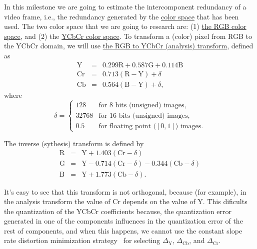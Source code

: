 In this milestone we are going to estimate the intercomponent
redundancy of a video frame, i.e., the redundancy generated by the
\href{https://en.wikipedia.org/wiki/Color_space}{color space} that has
been used. The two color space that we are going to research are: (1)
\href{https://en.wikipedia.org/wiki/RGB_color_model}{the RGB color
  space}, and (2) the \href{https://en.wikipedia.org/wiki/YCbCr}{YCbCr
  color space}. To transform a (color) pixel from RGB to the YCbCr
domain, we will use
\href{https://docs.opencv.org/3.4/de/d25/imgproc_color_conversions.html}{the
  RGB to YCbCr (analysis) transform}, defined as
\begin{equation}
  \begin{array}{lcl}
    \text{Y}  & = & 0.299\text{R} + 0.587\text{G} + 0.114\text{B} \\
    \text{Cr} & = & 0.713(\text{R} - \text{Y}) + \delta  \\
    \text{Cb} & = & 0.564(\text{B} - \text{Y}) + \delta,
  \end{array}
\end{equation}
where
\begin{equation}
  \delta = \left\{
  \begin{array}{ll}
    128 & \text{for 8 bits (unsigned) images},\\
    32768 & \text{for 16 bits (unsigned) images},\\
    0.5 & \text{for floating point (}[0,1]\text{) images}.
  \end{array}
  \right.
\end{equation}

The inverse (sythesis) transform is defined by
\begin{equation}
  \begin{array}{lcl}
    \text{R} & = & \text{Y} + 1.403(\text{Cr} - \delta) \\
    \text{G} & = & \text{Y} - 0.714(\text{Cr} - \delta) - 0.344(\text{Cb} - \delta)\\
    \text{B} & = & \text{Y} + 1.773(\text{Cb} - \delta).
  \end{array}
\end{equation}

It's easy to see that this transform is not orthogonal, because (for
example), in the analysis transform the value of Cr depends on the
value of Y. This dificults the quantization of the YCbCr coefficients
because, the quantization error generated in one of the components
influences in the quantization error of the rest of components, and
when this happens, we cannot use the constant slope rate distortion
minimization
strategy~\cite{vetterli1995wavelets,sayood2017introduction} for
selecting $\Delta_{\text{Y}}$, $\Delta_{\text{Cb}}$, and
$\Delta_{\text{Cr}}$.

